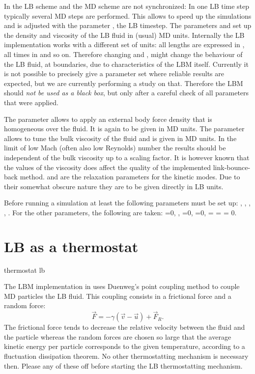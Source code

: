 In \es the LB scheme and the MD scheme are not synchronized: In one LB
time step typically several MD steps are performed. This allows to
speed up the simulations and is adjusted with the parameter ,
the LB timestep.
The parameters  and  set up the density and
viscosity of the LB fluid in (usual) MD units.  Internally the LB
implementation works with a different set of units: all lengths are
expressed in , all times in  and so on.  Therefore
changing  and , might change the behaviour of the
LB fluid, \eg at boundaries, due to characteristics of the LBM
itself. Currently it is not possible to precisely give a parameter set
where reliable results are expected, but we are currently performing a
study on that. Therefore the LBM should \emph{not be used as a black
  box}, but only after a careful check of all parameters that were
applied. 

The parameter  allows to apply an external body force
density that is homogeneous over the fluid. It is again to be given in
MD units.  The parameter  allows to tune the bulk
viscosity of the fluid and is given in MD units. In the limit of low
Mach (often also low Reynolds) number the results should be
independent of the bulk viscosity up to a scaling factor. 
It is however known that the values of the viscosity does 
affect the quality of the implemented link-bounce-back method.
 and
 are the relaxation parameters for the kinetic
modes. Due to their somewhat obscure nature they are to be given
directly in LB units.

Before running a simulation at least the following parameters must be
set up: , , , , . For the other
parameters, the following are taken: =0, ,
=0, =0,   =  =  = 0.

\section{LB as a thermostat}
\begin{essyntax}
  thermostat lb  
  \begin{features}
  \end{features}
\end{essyntax}
The LBM implementation in \es uses Duenweg's point coupling method
to couple MD particles the LB fluid. This coupling consists
in a frictional force and a random force:
\begin{equation*}
  \vec{F} = -\gamma \left(\vec{v}-\vec{u}\right) + \vec{F}_R.
\end{equation*}
The frictional force tends to decrease the relative velocity
between the fluid and the particle whereas the random forces are chosen
so large that the average kinetic energy per particle corresponds to
the given temperature, according to a fluctuation dissipation theorem.
No other thermostatting mechanism is necessary then. Please any of these
off before starting the LB thermostatting mechanism.


